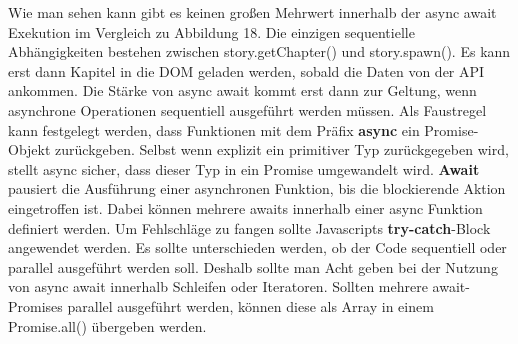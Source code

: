 \noindent
Wie man sehen kann gibt es keinen großen Mehrwert innerhalb der async await Exekution im Vergleich zu Abbildung 18. Die einzigen sequentielle Abhängigkeiten bestehen zwischen story.getChapter() und story.spawn(). Es kann erst dann Kapitel in die DOM geladen werden, sobald die Daten von der API ankommen. Die Stärke von async await kommt erst dann zur Geltung, wenn asynchrone Operationen sequentiell ausgeführt werden müssen. Als Faustregel kann festgelegt werden, dass Funktionen mit dem Präfix \textbf{async} ein Promise-Objekt zurückgeben. Selbst wenn explizit ein primitiver Typ zurückgegeben wird, stellt async sicher, dass dieser Typ in ein Promise umgewandelt wird. \textbf{Await} pausiert die Ausführung einer asynchronen Funktion, bis die blockierende Aktion eingetroffen ist. Dabei können mehrere awaits innerhalb einer async Funktion definiert werden. Um Fehlschläge zu fangen sollte Javascripts \textbf{try-catch}-Block angewendet werden. Es sollte unterschieden werden, ob der Code sequentiell oder parallel ausgeführt werden soll. Deshalb sollte man Acht geben bei der Nutzung von async await innerhalb Schleifen oder Iteratoren. Sollten mehrere await-Promises parallel ausgeführt werden, können diese als Array in einem Promise.all() übergeben werden.


